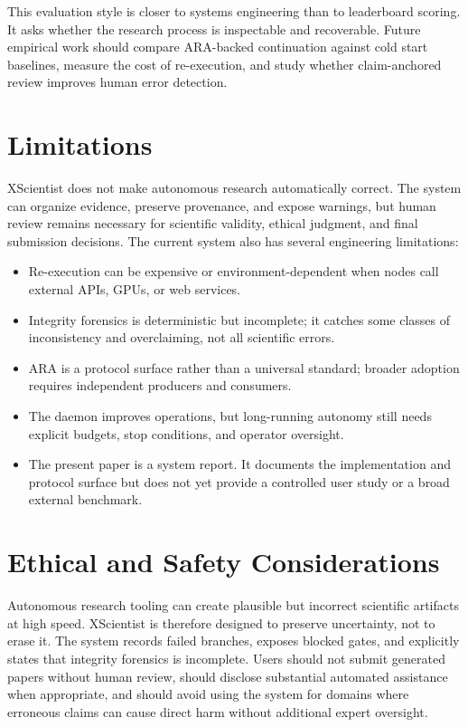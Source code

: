 \documentclass[11pt]{article}
\begin{document}
This evaluation style is closer to systems engineering than to leaderboard
scoring. It asks whether the research process is inspectable and recoverable.
Future empirical work should compare ARA-backed continuation against cold
start baselines, measure the cost of re-execution, and study whether
claim-anchored review improves human error detection.

\section{Limitations}

XScientist does not make autonomous research automatically correct. The
system can organize evidence, preserve provenance, and expose warnings, but
human review remains necessary for scientific validity, ethical judgment, and
final submission decisions. The current system also has several engineering
limitations:

\begin{itemize}[leftmargin=*]
  \item Re-execution can be expensive or environment-dependent when nodes
  call external APIs, GPUs, or web services.
  \item Integrity forensics is deterministic but incomplete; it catches some
  classes of inconsistency and overclaiming, not all scientific errors.
  \item ARA is a protocol surface rather than a universal standard; broader
  adoption requires independent producers and consumers.
  \item The daemon improves operations, but long-running autonomy still needs
  explicit budgets, stop conditions, and operator oversight.
  \item The present paper is a system report. It documents the implementation
  and protocol surface but does not yet provide a controlled user study or a
  broad external benchmark.
\end{itemize}

\section{Ethical and Safety Considerations}

Autonomous research tooling can create plausible but incorrect scientific
artifacts at high speed. XScientist is therefore designed to preserve
uncertainty, not to erase it. The system records failed branches, exposes
blocked gates, and explicitly states that integrity forensics is incomplete.
Users should not submit generated papers without human review, should disclose
substantial automated assistance when appropriate, and should avoid using the
system for domains where erroneous claims can cause direct harm without
additional expert oversight.
\end{document}
